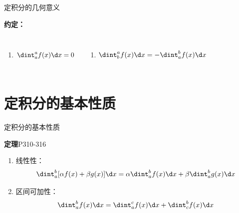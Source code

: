 \begin{frame}{定积分的几何意义}
\begin{center}
		\pause 
	\end{center}
	{\bf 约定：}\pause 
		\begin{columns}
			\begin{enumerate}
			  \item \alert{$\dint_a^af(x)\d x=0$}\pause 
			\end{enumerate}
			\begin{enumerate}
			  \addtocounter{enumi}{1}
			  \item \alert{$\dint_b^af(x)\d x=-\dint_a^bf(x)\d x$}
			\end{enumerate}
		\end{columns}
		
\end{frame}

\section{定积分的基本性质}

\begin{frame}{定积分的基本性质}
	\linespread{1.2}\pause 
	\begin{block}{{\bf 定理}\hfill P310-316}
		\begin{enumerate}\pause 
		  \item {\bb 线性性：}
		  $$\dint_a^b[\alpha
		  f(x)+\beta g(x)]\d x=\alpha\dint_a^bf(x)\d x+\beta\dint_a^bg(x)\d x$$\pause 
		  \item {\bb 区间可加性：}
		  $$\dint_a^bf(x)\d x=\dint_a^cf(x)\d x+\dint_c^bf(x)\d x$$
		\end{enumerate}
	\end{block}
\end{frame}

